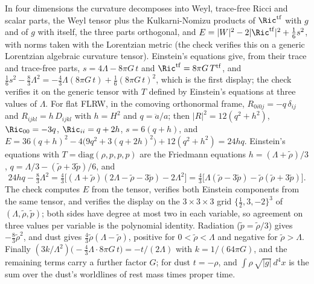 In four dimensions the curvature decomposes into Weyl, trace-free Ricci and scalar parts, the Weyl tensor plus the Kulkarni-Nomizu products of $\Ric^{\mathrm{tf}}$ with $g$ and of $g$ with itself, the three parts orthogonal, and $E = |W|^{2} - 2|\Ric^{\mathrm{tf}}|^{2} + \tfrac16 s^{2}$, with norms taken with the Lorentzian metric (the check verifies this on a generic Lorentzian algebraic curvature tensor). Einstein's equations give, from their trace and trace-free parts, $s = 4\Lambda - 8\pi G\,t$ and $\Ric^{\mathrm{tf}} = 8\pi G\,T^{\mathrm{tf}}$, and $\tfrac16 s^{2} - \tfrac83\Lambda^{2} = -\tfrac43\Lambda(8\pi G\,t) + \tfrac16(8\pi G\,t)^{2}$, which is the first display; the check verifies it on the generic tensor with $T$ defined by Einstein's equations at three values of $\Lambda$. For flat FLRW, in the comoving orthonormal frame, $R_{0i0j} = -q\,\delta_{ij}$ and $R_{ijkl} = h\,D_{ijkl}$ with $h = H^{2}$ and $q = \ddot a/a$; then $|R|^{2} = 12(q^{2} + h^{2})$, $\Ric_{00} = -3q$, $\Ric_{ii} = q + 2h$, $s = 6(q + h)$, and $E = 36(q + h)^{2} - 4\bigl(9q^{2} + 3(q + 2h)^{2}\bigr) + 12(q^{2} + h^{2}) = 24hq$. Einstein's equations with $T = \mathrm{diag}(\rho, p, p, p)$ are the Friedmann equations $h = (\Lambda + \tilde\rho)/3$, $q = \Lambda/3 - (\tilde\rho + 3\tilde p)/6$, and
\[
24hq - \tfrac83\Lambda^{2} = \tfrac{4}{3}\bigl[(\Lambda + \tilde\rho)(2\Lambda - \tilde\rho - 3\tilde p) - 2\Lambda^{2}\bigr] = \tfrac43\bigl[\Lambda(\tilde\rho - 3\tilde p) - \tilde\rho(\tilde\rho + 3\tilde p)\bigr].
\]
The check computes $E$ from the tensor, verifies both Einstein components from the same tensor, and verifies the display on the $3 \times 3 \times 3$ grid $\{\tfrac12, 3, -2\}^{3}$ of $(\Lambda, \tilde\rho, \tilde p)$; both sides have degree at most two in each variable, so agreement on three values per variable is the polynomial identity. Radiation ($\tilde p = \tilde\rho/3$) gives $-\tfrac83\tilde\rho^{2}$, and dust gives $\tfrac43\tilde\rho(\Lambda - \tilde\rho)$, positive for $0 < \tilde\rho < \Lambda$ and negative for $\tilde\rho > \Lambda$. Finally $(3k/\Lambda^{2})\bigl(-\tfrac43\Lambda\cdot 8\pi G\,t\bigr) = -t/(2\Lambda)$ with $k = 1/(64\pi G)$, and the remaining terms carry a further factor $G$; for dust $t = -\rho$, and $\int\rho\,\sqrt{|g|}\,d^{4}x$ is the sum over the dust's worldlines of rest mass times proper time.

